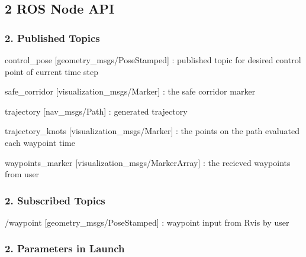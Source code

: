 

\subsection*{2 R\+OS Node A\+PI}

\subsubsection*{2. Published Topics}


\begin{DoxyItemize}
\item control\+\_\+pose \mbox{[}geometry\+\_\+msgs/\+Pose\+Stamped\mbox{]} \+: published topic for desired control point of current time step
\item safe\+\_\+corridor \mbox{[}visualization\+\_\+msgs/\+Marker\mbox{]} \+: the safe corridor marker
\item trajectory \mbox{[}nav\+\_\+msgs/\+Path\mbox{]} \+: generated trajectory
\item trajectory\+\_\+knots \mbox{[}visualization\+\_\+msgs/\+Marker\mbox{]} \+: the points on the path evaluated each waypoint time
\item waypoints\+\_\+marker \mbox{[}visualization\+\_\+msgs/\+Marker\+Array\mbox{]} \+: the recieved waypoints from user
\end{DoxyItemize}

\subsubsection*{2. Subscribed Topics}


\begin{DoxyItemize}
\item /waypoint \mbox{[}geometry\+\_\+msgs/\+Pose\+Stamped\mbox{]} \+: waypoint input from Rvis by user
\end{DoxyItemize}

\subsubsection*{2. Parameters in Launch}


